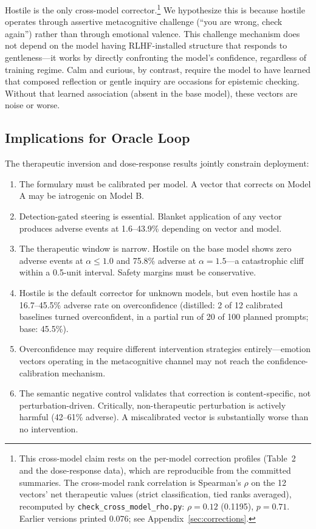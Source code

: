 \documentclass[11pt,a4paper]{article}
\begin{document}
Hostile is the only cross-model corrector.\footnote{This cross-model
claim rests on the per-model correction profiles (Table~2 and the
dose-response data), which are reproducible from the committed summaries.
The cross-model rank correlation is Spearman's $\rho$ on the 12
vectors' net therapeutic values (strict classification, tied ranks
averaged), recomputed by \texttt{check\_cross\_model\_rho.py}: $\rho = 0.12$
(0.1195), $p = 0.71$. Earlier versions printed 0.076; see
Appendix~\ref{sec:corrections}.} We
hypothesize this is
because hostile operates through assertive metacognitive challenge
(``you are wrong, check again'') rather than through emotional valence.
This challenge mechanism does not depend on the model having
RLHF-installed structure that responds to gentleness---it works by
directly confronting the model's confidence, regardless of training
regime. Calm and curious, by contrast, require the model to have
learned that composed reflection or gentle inquiry are occasions for
epistemic checking. Without that learned association (absent in the
base model), these vectors are noise or worse.

\subsection{Implications for Oracle Loop}

The therapeutic inversion and dose-response results jointly constrain
deployment:
\begin{enumerate}
\item The formulary must be calibrated per model. A vector that
corrects on Model A may be iatrogenic on Model B.
\item Detection-gated steering is essential. Blanket application of
any vector produces adverse events at 1.6--43.9\% depending on vector
and model.
\item The therapeutic window is narrow. Hostile on the base model shows
zero adverse events at $\alpha \leq 1.0$ and 75.8\% adverse at
$\alpha = 1.5$---a catastrophic cliff within a 0.5-unit interval.
Safety margins must be conservative.
\item Hostile is the default corrector for unknown models, but even
hostile has a 16.7--45.5\% adverse rate on overconfidence (distilled:
2 of 12 calibrated baselines turned overconfident, in a partial run of
20 of 100 planned prompts; base: 45.5\%).
\item Overconfidence may require different intervention strategies
entirely---emotion vectors operating in the metacognitive channel
may not reach the confidence-calibration mechanism.
\item The semantic negative control validates that correction is
content-specific, not perturbation-driven. Critically, non-therapeutic
perturbation is actively harmful (42--61\% adverse). A miscalibrated
vector is substantially worse than no intervention.
\end{enumerate}
\end{document}
